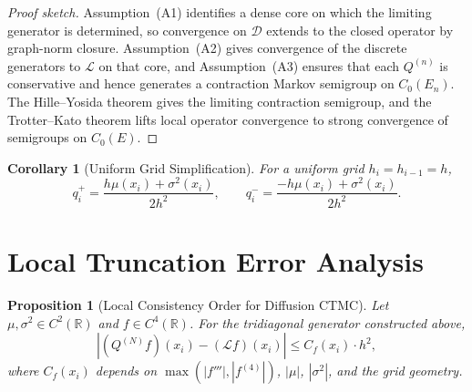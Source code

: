 \documentclass[11pt,a4paper,openany]{book}
\theoremstyle{definition}
\theoremstyle{plain}
\newtheorem{proposition}[theorem]{Proposition}
\newtheorem{corollary}[theorem]{Corollary}
\theoremstyle{remark}
\newcommand{\1}{\mathbbm{1}}
\newcommand{\R}{\mathbb{R}}
\newcommand{\calL}{\mathcal{L}}
\begin{document}
\begin{proof}[Proof sketch]
Assumption~(A1) identifies a dense core on which the limiting generator is determined, so convergence on $\mathcal{D}$ extends to the closed operator by graph-norm closure. Assumption~(A2) gives convergence of the discrete generators to $\mathcal{L}$ on that core, and Assumption~(A3) ensures that each $Q^{(n)}$ is conservative and hence generates a contraction Markov semigroup on $C_0(E_n)$. The Hille--Yosida theorem gives the limiting contraction semigroup, and the Trotter--Kato theorem lifts local operator convergence to strong convergence of semigroups on $C_0(E)$.
\end{proof}

\begin{corollary}[Uniform Grid Simplification]
For a uniform grid $h_{i} = h_{i-1} = h$,
\[
\boxed{q_{i}^{+} = \frac{h \mu(x_{i}) + \sigma^{2}(x_{i})}{2h^{2}}, \qquad
q_{i}^{-} = \frac{-h \mu(x_{i}) + \sigma^{2}(x_{i})}{2h^{2}}}.
\]
\end{corollary}

\section{Local Truncation Error Analysis}

\begin{proposition}[Local Consistency Order for Diffusion CTMC]
Let $\mu, \sigma^{2} \in C^{2}(\R)$ and $f \in C^{4}(\R)$. For the tridiagonal generator constructed above,
\[
|(Q^{(N)} f)(x_{i}) - (\calL f)(x_{i})| \leq C_{f}(x_{i}) \cdot h^{2},
\]
where $C_{f}(x_{i})$ depends on $\max(|f'''|, |f^{(4)}|)$, $|\mu|$, $|\sigma^{2}|$, and the grid geometry.
\end{proposition}
\end{document}
